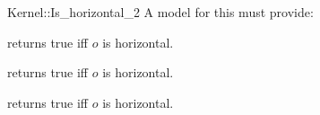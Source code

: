 \begin{ccRefFunctionObjectConcept}{Kernel::Is_horizontal_2}
A model for this must provide:


{returns true iff $o$ is horizontal.}

{returns true iff $o$ is horizontal.}

{returns true iff $o$ is horizontal.}

\ccIsModel{}

\end{ccRefFunctionObjectConcept}

